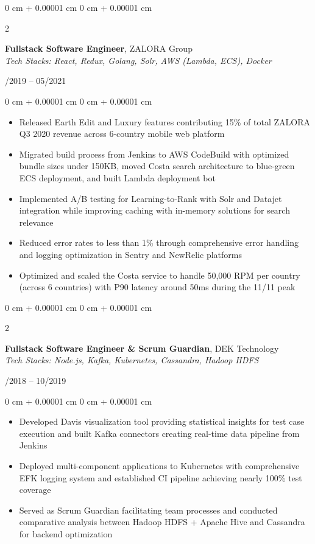 \documentclass[10pt, letterpaper]{article}
\newenvironment{highlights}{
    \begin{itemize}[
        topsep=0.10 cm,
        parsep=0.10 cm,
        partopsep=0pt,
        itemsep=0pt,
        leftmargin=0 cm + 10pt
    ]
}{
    \end{itemize}
}
\newenvironment{onecolentry}{
    \begin{adjustwidth}{
        0 cm + 0.00001 cm
    }{
        0 cm + 0.00001 cm
    }
}{
    \end{adjustwidth}
}
\newenvironment{twocolentry}[2][]{
    \onecolentry
    \def\secondColumn{#2}
    \setcolumnwidth{\fill, 4.5 cm}
    \begin{paracol}{2}
}{
    \switchcolumn \raggedleft \secondColumn
    \end{paracol}
    \endonecolentry
}
\begin{document}
    \begin{twocolentry}{10/2019 -- 05/2021}
        \textbf{Fullstack Software Engineer}, ZALORA Group\\
        \textit{Tech Stacks: React, Redux, Golang, Solr, AWS (Lambda, ECS), Docker}
    \end{twocolentry}
    \vspace{0.15cm}
    \begin{onecolentry}
        \begin{highlights}
            \item Released Earth Edit and Luxury features contributing 15\% of total ZALORA Q3 2020 revenue across 6-country mobile web platform
            \item Migrated build process from Jenkins to AWS CodeBuild with optimized bundle sizes under 150KB, moved Costa search architecture to blue-green ECS deployment, and built Lambda deployment bot
            \item Implemented A/B testing for Learning-to-Rank with Solr and Datajet integration while improving caching with in-memory solutions for search relevance
            \item Reduced error rates to less than 1\% through comprehensive error handling and logging optimization in Sentry and NewRelic platforms
            \item Optimized and scaled the Costa service to handle 50,000 RPM per country (across 6 countries) with P90 latency around 50ms during the 11/11 peak
        \end{highlights}
    \end{onecolentry}
    \vspace{0.3cm}

    \begin{twocolentry}{04/2018 -- 10/2019}
        \textbf{Fullstack Software Engineer \& Scrum Guardian}, DEK Technology\\
        \textit{Tech Stacks: Node.js, Kafka, Kubernetes, Cassandra, Hadoop HDFS}
    \end{twocolentry}
    \vspace{0.15cm}
     \begin{onecolentry}
        \begin{highlights}
            \item Developed Davis visualization tool providing statistical insights for test case execution and built Kafka connectors creating real-time data pipeline from Jenkins

            \item Deployed multi-component applications to Kubernetes with comprehensive EFK logging system and established CI pipeline achieving nearly 100\% test coverage

            \item Served as Scrum Guardian facilitating team processes and conducted comparative analysis between Hadoop HDFS + Apache Hive and Cassandra for backend optimization
        \end{highlights}
    \end{onecolentry}
\end{document}
